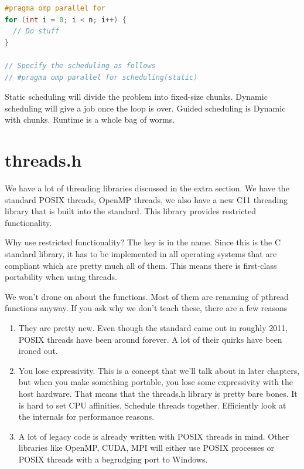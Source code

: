 \begin{lstlisting}[language=C]
#pragma omp parallel for
for (int i = 0; i < n; i++) {
  // Do stuff
}

// Specify the scheduling as follows
// #pragma omp parallel for scheduling(static)
\end{lstlisting}

Static scheduling will divide the problem into fixed-size chunks.
Dynamic scheduling will give a job once the loop is over.
Guided scheduling is Dynamic with chunks.
Runtime is a whole bag of worms.

\section{threads.h}

We have a lot of threading libraries discussed in the extra section.
We have the standard POSIX threads, OpenMP threads, we also have a new C11 threading library that is built into the standard.
This library provides restricted functionality.

Why use restricted functionality?
The key is in the name.
Since this is the C standard library, it has to be implemented in all operating systems that are compliant which are pretty much all of them.
This means there is first-class portability when using threads.

We won't drone on about the functions.
Most of them are renaming of pthread functions anyway.
If you ask why we don't teach these, there are a few reasons

\begin{enumerate}
\item They are pretty new. Even though the standard came out in roughly 2011, POSIX threads have been around forever.
  A lot of their quirks have been ironed out.
\item You lose expressivity.
  This is a concept that we'll talk about in later chapters, but when you make something portable, you lose some expressivity with the host hardware.
  That means that the threads.h library is pretty bare bones.
  It is hard to set CPU affinities.
  Schedule threads together.
  Efficiently look at the internals for performance reasons.
\item A lot of legacy code is already written with POSIX threads in mind.
  Other libraries like OpenMP, CUDA, MPI will either use POSIX processes or POSIX threads with a begrudging port to Windows.
\end{enumerate}

